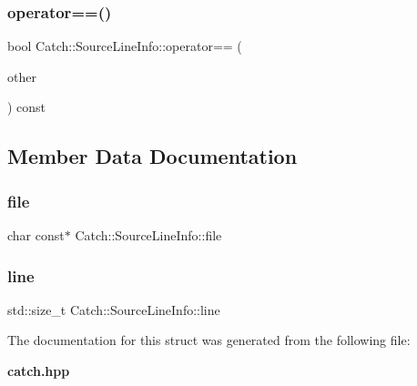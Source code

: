 \mbox{\label{struct_catch_1_1_source_line_info_a688e761986879266658f000f14ab8a42}} 
\subsubsection{operator==()}
{\footnotesize\ttfamily bool Catch\+::\+Source\+Line\+Info\+::operator== (\begin{DoxyParamCaption}\item[{\textbf{ Source\+Line\+Info} const \&}]{other }\end{DoxyParamCaption}) const}



\subsection{Member Data Documentation}
\mbox{\label{struct_catch_1_1_source_line_info_ad65537703e9f08c1fa7777fbc3f0c617}} 
\subsubsection{file}
{\footnotesize\ttfamily char const$\ast$ Catch\+::\+Source\+Line\+Info\+::file}

\mbox{\label{struct_catch_1_1_source_line_info_a841e5d696c7b9cde24e45e61dd979c77}} 
\subsubsection{line}
{\footnotesize\ttfamily std\+::size\+\_\+t Catch\+::\+Source\+Line\+Info\+::line}



The documentation for this struct was generated from the following file\+:\begin{DoxyCompactItemize}
\item 
\textbf{ catch.\+hpp}\end{DoxyCompactItemize}
